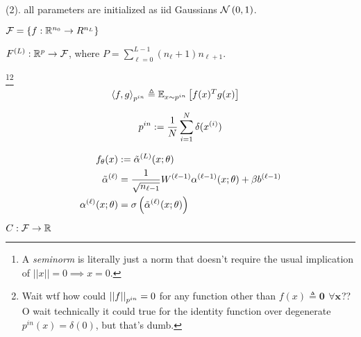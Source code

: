 \documentclass[11pt]{article}
\renewcommand\vec[2][]{\bm{#2}_{#1}}
\begin{document}


\vspace{-1em}
 (2).  all parameters are initialized as iid Gaussians $\Gauss{0, 1}$.
	\begin{compactitem}
		\item {} $\mathcal F = \{f: \R^{n_0} \to R^{n_L}\}$ 
		
		\item {} $F^{(L)}: \R^p \to \mathcal F$, where $P = \sum_{\ell = 0}^{L - 1} (n_{\ell} + 1) n_{\ell + 1}$. 
		
		\item {}\footnote{A \textit{seminorm} is literally just a norm that doesn't require the usual implication of $||x|| = 0 \implies x = 0$.}\footnote{Wait wtf how could $\norm[p^{in}]{f} = 0$ for any function other than $f(x) \triangleq \vec 0$ $\forall \vec x$?? O wait technically it could true for the identity function over degenerate $p^{in}(x) = \delta(0)$, but that's dumb.}
		\begin{align}
			\innerprod{f}{g}_{p^{in}} 
				&\triangleq \E[x \sim p^{in}]{f(x)^T g(x)}
		\end{align}
	
		\item {}
		\begin{align}
			p^{in} 	:= \inv{N} \sum_{i=1}^{N} \delta(\ival[i]{x})
		\end{align}
	
		\item {}
		\begin{align}
			f_{\theta}(x) 
				&:= \tilde\alpha^{(L)}(x; \theta) \\
			\tilde\alpha^{(\ell)}
				&= \inv{\sqrt{n_{\ell-1}}} W^{(\ell-1)} \alpha^{(\ell-1)}(x; \theta) + \beta b^{(\ell-1)} \\
				\alpha^{(\ell)}(x; \theta) 
				&= \sigma\lr{ \tilde \alpha^{(\ell)}(x; \theta) }
		\end{align}
	
		\item {} $C: \mathcal F \to \R$
		

\end{compactitem}
\end{document}
